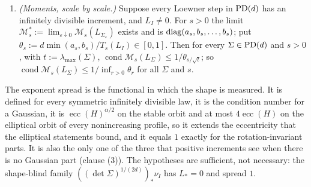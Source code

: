 \begin{proposition}
\begin{enumerate}
increment, or that $C \equiv 0$ and every Loewner step has a positive finite increment; and that
$\psi_* \ge \theta\psi_I$ for some $\theta \in (0,1]$. Then $\theta\psi_{tI} \le \psi_\Sigma \le \psi_{tI}$ and
$\operatorname{es}(\psi_\Sigma) \le 1/\theta$ for every $\Sigma \in \PD(d)$, $t := \lambda_{\max}(\Sigma)$.
\item \emph{(Moments, scale by scale.)} Suppose every Loewner step in $\mathrm{PD}(d)$ has an infinitely
divisible increment, and $L_I \ne 0$. For $s > 0$ the limit $\mathcal M_s^* := \lim_{\varepsilon\downarrow0}\mathcal M_s(L_{\Sigma_\varepsilon})$
exists and is $\operatorname{diag}(a_s, b_s, \dots, b_s)$; put $\theta_s := d\min(a_s,b_s)/T_s(L_I) \in [0,1]$. Then for every
$\Sigma \in \PD(d)$ and $s > 0$, with $t := \lambda_{\max}(\Sigma)$,
$\operatorname{cond}\mathcal M_s(L_\Sigma) \le 1/\theta_{s/\sqrt t}$; so
$\operatorname{cond}\mathcal M_s(L_\Sigma) \le 1/\inf_{r>0}\theta_r$ for all $\Sigma$ and $s$.
\end{enumerate}
\end{proposition}

The exponent spread is the functional in which the shape is measured. It is defined for every
symmetric infinitely divisible law, it is the condition number for a Gaussian, it is
$\operatorname{ecc}(H)^{\alpha/2}$ on the stable orbit and at most $4\operatorname{ecc}(H)$ on the
elliptical orbit of every nonincreasing profile, so it extends the eccentricity that the elliptical statements bound, and it equals
$1$ exactly for the rotation-invariant parts. It is also the only one of the three that positive
increments see when there is no Gaussian part (clause (3)). The hypotheses are sufficient, not
necessary: the shape-blind family $((\det\Sigma)^{1/(2d)})_*\nu_I$ has $L_* = 0$ and spread $1$.

